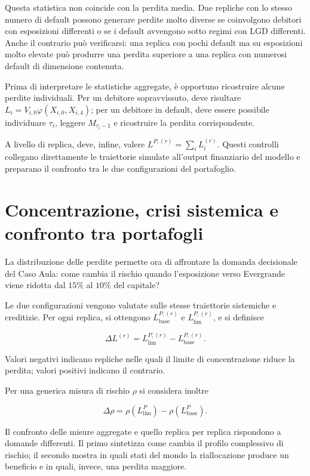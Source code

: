 Questa statistica non coincide con la perdita media. Due repliche con lo
stesso numero di default possono generare perdite molto diverse se
coinvolgono debitori con esposizioni differenti o se i default avvengono
sotto regimi con $\mathrm{LGD}$ differenti. Anche il contrario pu\`o verificarsi: una replica con pochi default ma su
esposizioni molto elevate pu\`o produrre una perdita superiore a una
replica con numerosi default di dimensione contenuta.

Prima di interpretare le statistiche aggregate, \`e opportuno ricostruire
alcune perdite individuali. Per un debitore sopravvissuto, deve risultare
$L_i=V_{i,0}\varphi(X_{i,0},X_{i,4})$; per un debitore in default, deve essere
possibile individuare $\tau_i$, leggere $M_{\tau_i-1}$ e ricostruire la
perdita corrispondente.

A livello di replica, deve, infine, valere
$L^{P,(r)}=\sum_iL_i^{(r)}$. Questi controlli collegano direttamente le
traiettorie simulate all'output finanziario del modello e preparano il
confronto tra le due configurazioni del portafoglio.
%


\section{Concentrazione, crisi sistemica e confronto tra portafogli}

La distribuzione delle perdite permette ora di affrontare la domanda
decisionale del Caso Aula: come cambia il rischio quando l'esposizione verso
Evergrande viene ridotta dal $15\%$ al $10\%$ del capitale?

Le due configurazioni vengono valutate sulle stesse traiettorie sistemiche e
creditizie. Per ogni replica, si ottengono
$L_{\mathrm{base}}^{P,(r)}$ e $L_{\mathrm{lim}}^{P,(r)}$, e si definisce

\[
\Delta L^{(r)}
=
L_{\mathrm{lim}}^{P,(r)}
-
L_{\mathrm{base}}^{P,(r)}.
\]

Valori negativi indicano repliche nelle quali il limite di concentrazione riduce
la perdita; valori positivi indicano il contrario.

Per una generica misura di rischio $\rho$ si considera inoltre

\[
\Delta\rho
=
\rho(L_{\mathrm{lim}}^P)
-
\rho(L_{\mathrm{base}}^P).
\]

Il confronto delle misure aggregate e quello replica per replica
rispondono a domande differenti. Il primo sintetizza come cambia il profilo
complessivo di rischio; il secondo mostra in quali stati del mondo la
riallocazione produce un beneficio e in quali, invece, una perdita maggiore.

